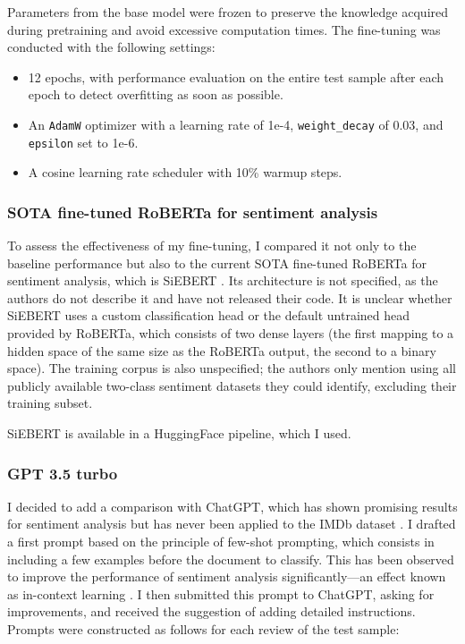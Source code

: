 \documentclass{article}
\begin{document}
Parameters from the base model were frozen to preserve the knowledge acquired during pretraining and avoid excessive computation times. The fine-tuning was conducted with the following settings:
\begin{itemize}
    \item 12 epochs, with performance evaluation on the entire test sample after each epoch to detect overfitting as soon as possible.
	\item An \texttt{AdamW} optimizer with a learning rate of 1e-4, \texttt{weight\_decay} of 0.03, and \texttt{epsilon} set to 1e-6.
    \item A cosine learning rate scheduler with 10\% warmup steps.
\end{itemize}

\subsubsection{SOTA fine-tuned RoBERTa for sentiment analysis}

To assess the effectiveness of my fine-tuning, I compared it not only to the baseline performance but also to the current SOTA fine-tuned RoBERTa for sentiment analysis, which is SiEBERT \citep{hartmann_more_2023}. Its architecture is not specified, as the authors do not describe it and have not released their code. It is unclear whether SiEBERT uses a custom classification head or the default untrained head provided by RoBERTa, which consists of two dense layers (the first mapping to a hidden space of the same size as the RoBERTa output, the second to a binary space). The training corpus is also unspecified; the authors only mention using all publicly available two-class sentiment datasets they could identify, excluding their training subset.

SiEBERT is available in a HuggingFace pipeline, which I used.

\subsubsection{GPT 3.5 turbo}

I decided to add a comparison with ChatGPT, which has shown promising results for sentiment analysis but has never been applied to the IMDb dataset \citep{wang_is_2024}. I drafted a first prompt based on the principle of few-shot prompting, which consists in including a few examples before the document to classify. This has been observed to improve the performance of sentiment analysis significantly—an effect known as in-context learning \citep{brown_language_2020}. I then submitted this prompt to ChatGPT, asking for improvements, and received the suggestion of adding detailed instructions. Prompts were constructed as follows for each review of the test sample:
\end{document}

